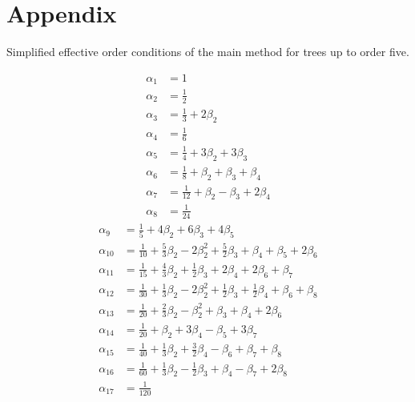 \section{Appendix}\label{appendixB}


\begin{table}[h]
  \caption{Simplified effective order conditions of the main method for trees up to order five.}
  \begin{multicols}{2}
    \begin{align*}
      \alpha_{1}  &= 1 \\
      \alpha_{2}  &= \frac{1}{2} \\
      \alpha_{3}  &= \frac{1}{3} + 2\beta_{2} \\
      \alpha_{4}  &= \frac{1}{6} \\
      \alpha_{5}  &= \frac{1}{4} + 3\beta_{2} + 3\beta_{3} \\
      \alpha_{6}  &= \frac{1}{8} + \beta_{2} + \beta_{3} + \beta_{4} \\
      \alpha_{7}  &= \frac{1}{12} +\beta_{2} - \beta_{3} + 2\beta_{4} \\
      \alpha_{8}  &= \frac{1}{24}
    \end{align*}
    \begin{align*}
      \alpha_{9}  &= \frac{1}{5} + 4\beta_{2} + 6\beta_{3} + 4\beta_{5} \\
      \alpha_{10} &= \frac{1}{10} + \frac{5}{3}\beta_{2} - 2\beta_{2}^{2} + \frac{5}{2}\beta_{3} + \beta_{4} + \beta_{5} + 2\beta_{6} \\
      \alpha_{11} &= \frac{1}{15} + \frac{4}{3}\beta_{2} + \frac{1}{2}\beta_{3} + 2\beta_{4} + 2\beta_{6} + \beta_{7} \\
      \alpha_{12} &= \frac{1}{30} + \frac{1}{3}\beta_{2} - 2\beta_{2}^{2} + \frac{1}{2}\beta_{3} + \frac{1}{2}\beta_{4} + \beta_{6} + \beta_{8} \\
      \alpha_{13} &= \frac{1}{20} + \frac{2}{3}\beta_{2} - \beta_{2}^{2} + \beta_{3} + \beta_{4} + 2\beta_{6} \\
      \alpha_{14} &= \frac{1}{20} + \beta_{2} + 3\beta_{4} - \beta_{5} + 3\beta_{7} \\
      \alpha_{15} &= \frac{1}{40} + \frac{1}{3}\beta_{2} + \frac{3}{2}\beta_{4} - \beta_{6} + \beta_{7} + \beta_{8} \\
      \alpha_{16} &= \frac{1}{60} + \frac{1}{3}\beta_{2} - \frac{1}{2}\beta_{3} + \beta_{4} - \beta_{7} + 2\beta_{8} \\
      \alpha_{17} &= \frac{1}{120}
    \end{align*}
  \end{multicols}
  \label{tableB.1}
\end{table}

